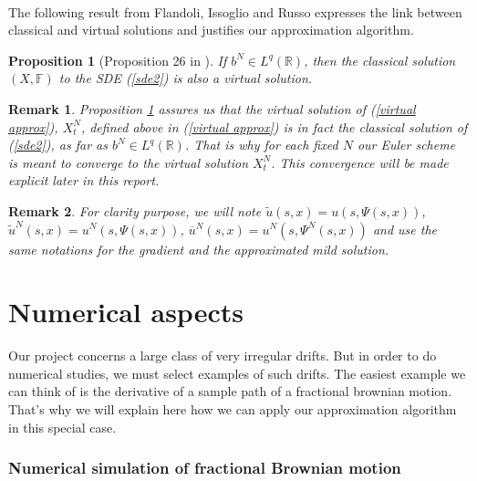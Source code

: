\documentclass[11pt]{enstaPRE}
\newtheorem{Pro}[theo]{Proposition}
\newtheorem{rem}{Remark}
\newcommand{\R}{\mathbb{R}}
\begin{document}
\paragraph{}
The following result from Flandoli, Issoglio and Russo expresses the link between classical and virtual solutions and justifies our approximation algorithm.

\begin{Pro}[Proposition 26 in \cite{Fla-Iss-Rus-2017}]\label{rus}
    If $b^N\in L^q(\R)$, then the classical solution $(X,\mathbb{F})$ to the SDE (\ref{sde2}) is also a virtual solution.
\end{Pro}

\begin{rem}
    Proposition \ref{rus} assures us that the virtual solution of (\ref{virtual approx}), $X^N_t$, defined above in (\ref{virtual approx}) is in fact the classical solution of (\ref{sde2}), as far as $b^N\in L^q(\R)$. That is why for each fixed $N$ our Euler scheme is meant to converge to the virtual solution $X^N_t$. This convergence will be made explicit later in this report.
\end{rem}

\begin{rem}  
    For clarity purpose, we will note $\tilde{u}\left(s,x\right) = u\left(s,\Psi\left(s,x\right)\right)$, $\tilde{u}^N\left(s,x\right) = u^N\left(s,\Psi\left(s,x\right)\right)$, $\overline{u}^N\left(s,x\right) = u^N\left(s,\Psi^N\left(s,x\right)\right)$ and use the same notations for the gradient and the approximated mild solution. 
\end{rem}

\part{Numerical aspects}

Our project concerns a large class of very irregular drifts. But in order to do numerical studies, we must select examples of such drifts. The easiest example we can think of is the derivative of a sample path of a fractional brownian motion. That's why we will explain here how we can apply our approximation algorithm in this special case.

\section{Numerical simulation of fractional Brownian motion}    
\end{document}
